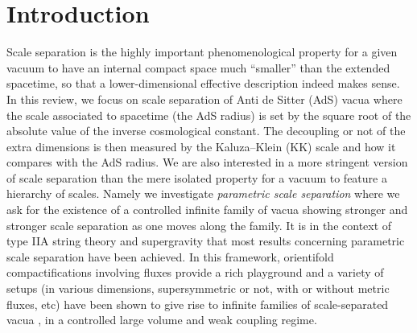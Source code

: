 \documentclass[11pt, a4paper]{article}
\begin{document}

\tableofcontents

\section{Introduction}
\label{sec:Introduction}

Scale separation is the highly important phenomenological property for a given vacuum to have an internal compact space much ``smaller'' than the extended spacetime, so that a lower-dimensional effective description indeed makes sense. In this review, we focus on scale separation of Anti de Sitter (AdS) vacua where the scale associated to spacetime (the AdS radius) is set by the square root of the absolute value of the inverse cosmological constant. The decoupling or not of the extra dimensions is then measured by the Kaluza--Klein (KK) scale and how it compares with the AdS radius. We are also interested in a more stringent version of scale separation than the mere isolated property for a vacuum to feature a hierarchy of scales. Namely we investigate \emph{parametric scale separation} where we ask for the existence of a controlled infinite family of vacua showing stronger and stronger scale separation as one moves along the family. It is in the context of type IIA string theory and supergravity that most results concerning parametric scale separation have been achieved. In this framework, orientifold compactifications involving fluxes provide a rich playground and a variety of setups (in various dimensions, supersymmetric or not, with or without metric fluxes, etc) have been shown to give rise to infinite families of scale-separated vacua \cite{DeWolfe:2005uu,Narayan:2010em,Marchesano:2019hfb,Farakos:2020phe,VanHemelryck:2022ynr,Farakos:2023nms,Farakos:2023wps,Camara:2005dc,Derendinger:2004jn,Villadoro:2005cu,Marchesano:2020uqz,Cribiori:2021djm,Carrasco:2023hta}, in a controlled large volume and weak coupling regime.
\end{document}
